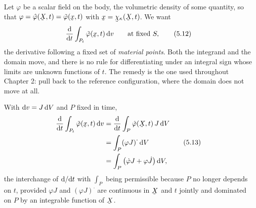 Let $\varphi$ be a scalar field on the body, the volumetric density of
some quantity, so that $\varphi=\hat\varphi(\bX,t)=\tilde\varphi(\bx,t)$
with $\bx=\bchi_{\kappa}(\bX,t)$. We want
\begin{equation}
   \frac{\dl}{\dl t}\int_{P_{t}}\tilde\varphi(\bx,t)\,\dl v
   \qquad\text{at fixed }S,
   \tag{5.12}\label{eq:5.12}
\end{equation}
the derivative following a fixed set of \emph{material points}. Both the
integrand and the domain move, and there is no rule for differentiating
under an integral sign whose limits are unknown functions of $t$. The
remedy is the one used throughout Chapter 2: pull back to the reference
configuration, where the domain does not move at all.

With $\mathrm{d} v=J\,\mathrm{d} V$ and $P$ fixed in time,
\begin{equation}
\begin{aligned}
   \frac{\dl}{\dl t}\int_{P_{t}}\tilde\varphi(\bx,t)\,\dl v
   &=\frac{\dl}{\dl t}\int_{P}\hat\varphi(\bX,t)\,J\,\dl V\\
   &=\int_{P}(\varphi J)^{\textstyle\cdot}\,\dl V\\
   &=\int_{P}\big(\dot\varphi J+\varphi\dot J\big)\,\dl V ,
\end{aligned}
   \tag{5.13}\label{eq:5.13}
\end{equation}
the interchange of $\mathrm{d}/\mathrm{d} t$ with $\int_{P}$ being permissible because
$P$ no longer depends on $t$, provided $\varphi J$ and $(\varphi J)^{
\textstyle\cdot}$ are continuous in $\bX$ and $t$ jointly and dominated on
$P$ by an integrable function of $\bX$.

